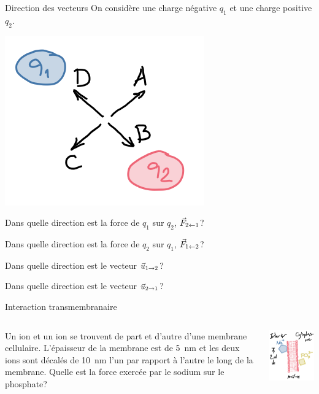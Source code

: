 \documentclass{beamer}
\begin{document}
\begin{frame}{Direction des vecteurs}
  On considère une charge négative $q_1$ et une charge positive $q_2$.
  \begin{center}
    \includegraphics[scale=0.5]{figures/coulomb-direction.png}
  \end{center}

  Dans quelle direction est la force de $q_1$ sur $q_2$, $\vec{F}_{2 \leftarrow 1}$?
  \pause

  Dans quelle direction est la force de $q_2$ sur $q_1$, $\vec{F}_{1 \leftarrow 2}$?
  \pause
  
  Dans quelle direction est le vecteur $\vec{u}_{1 \rightarrow 2}$?
  \pause

  Dans quelle direction est le vecteur $\vec{u}_{2 \rightarrow 1}$?
\end{frame}


\begin{frame}{Interaction transmembranaire}
\begin{columns}
    Un ion  et un ion  se trouvent de part et d'autre d'une
    membrane cellulaire. L'épaisseur de la membrane est de \SI{5}{nm} et les
    deux ions sont décalés de \SI{10}{nm} l'un par rapport à l'autre le long de
    la membrane. Quelle est la force exercée par le sodium sur le phosphate?

  \begin{center}
    \includegraphics[scale=0.5]{figures/exercice-membrane.png}
  \end{center}
\end{columns}
\end{frame}
\end{document}
